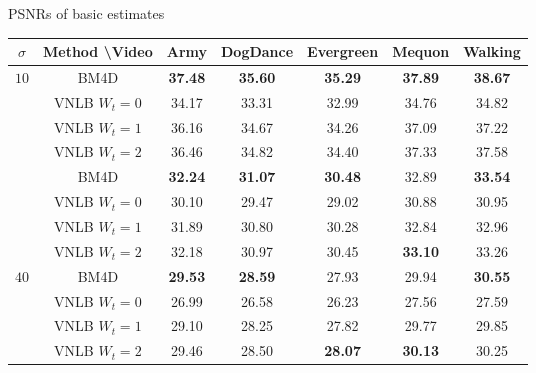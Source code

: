 \documentclass[mathserif]{beamer}
\makeatletter
\newcounter{multipleslide}
\newcommand{\multipleframe}{%
\setcounter{multipleslide}{\value{framenumber}}
\stepcounter{multipleslide}
\patchcmd{\beamer@@tmpl@footline}%
	{\insertframenumber}%
	{\themultipleslide}%
	{}%
	{}%
}
\makeatother
\begin{document}
\multipleframe
\begin{frame}{PSNRs of basic estimates}

	{\small
	\begin{tabular}{| c | c |c c c c c|}
		\hline \hline
		$\sigma$  & Method \textbackslash Video & Army & DogDance & Evergreen & Mequon & Walking \\\hline\hline
		\multirow{5}{*}{$10$} & BM4D           & \textbf{37.48} & \textbf{35.60} & \textbf{35.29} & \textbf{37.89} & \textbf{38.67} \\%
		                      & VNLB $W_t = 0$ &         34.17  &         33.31  &         32.99  &         34.76  &         34.82  \\%
		                      & VNLB $W_t = 1$ &         36.16  &         34.67  &         34.26  &         37.09  &         37.22  \\%
		                      & VNLB $W_t = 2$ &         36.46  &         34.82  &         34.40  &         37.33  &         37.58  \\\hline
%									 
		\multirow{5}{*}{$25$} & BM4D           & \textbf{32.24} & \textbf{31.07} & \textbf{30.48} &         32.89  & \textbf{33.54} \\%
		                      & VNLB $W_t = 0$ &         30.10  &         29.47  &         29.02  &         30.88  &         30.95  \\%
		                      & VNLB $W_t = 1$ &         31.89  &         30.80  &         30.28  &         32.84  &         32.96  \\%
		                      & VNLB $W_t = 2$ &         32.18  &         30.97  &         30.45  & \textbf{33.10} &         33.26  \\\hline
%									 
		\multirow{5}{*}{$40$} & BM4D           & \textbf{29.53} & \textbf{28.59} &         27.93  &         29.94  & \textbf{30.55} \\%
		                      & VNLB $W_t = 0$ &         26.99  &         26.58  &         26.23  &         27.56  &         27.59  \\%
		                      & VNLB $W_t = 1$ &         29.10  &         28.25  &         27.82  &         29.77  &         29.85  \\%
									 & VNLB $W_t = 2$ &         29.46  &         28.50  & \textbf{28.07} & \textbf{30.13} &         30.25  \\\hline\hline
	\end{tabular}}

\end{frame}
\end{document}
